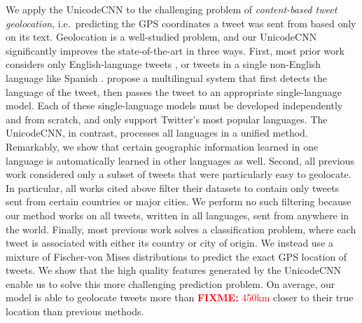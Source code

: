 \documentclass[sigconf,anonymous,review,10pt]{acmart}
\newcommand{\defn}[1]{\textit{#1}}
\newcommand{\fixme}[1]{\textcolor{red}{\textbf{FIXME:} {#1}}}
\begin{document}
We apply the UnicodeCNN to the challenging problem of \defn{content-based tweet geolocation},
i.e.\ predicting the GPS coordinates a tweet was sent from based only on its text.
Geolocation is a well-studied problem,
and our UnicodeCNN significantly improves the state-of-the-art in three ways.
First, most prior work considers only English-language tweets \citep{cheng2010you,li2012towards,han2013stacking,mahmud2014home,compton2014geotagging,zhang2014geocoding,rahimi2015twitter,dredze2016geolocation,rahimi2017neural},
or tweets in a single non-English language like Spanish \citep{maier2014language,gonccalves2015learning,tinoco2017variation}. %
\citet{han2014text} propose a multilingual system that first detects the language of the tweet,
then passes the tweet to an appropriate single-language model.
Each of these single-language models must be developed independently and from scratch,
and \citet{han2014text} only support Twitter's most popular languages.
The UnicodeCNN, in contrast, processes all languages in a unified method.
Remarkably, we show that certain geographic information learned in one language is automatically learned in other languages as well.
Second, all previous work considered only a subset of tweets that were particularly easy to geolocate.
In particular, all works cited above filter their datasets to contain only tweets sent from certain countries or major cities.
We perform no such filtering because our method works on all tweets, written in all languages, sent from anywhere in the world.
Finally, most previous work solves a classification problem,
where each tweet is associated with either its country or city of origin.
We instead use a mixture of Fischer-von Mises distributions to predict the exact GPS location of tweets.
We show that the high quality features generated by the UnicodeCNN enable us to solve this more challenging prediction problem.
On average, our model is able to geolocate tweets more than \fixme{450km} closer to their true location than previous methods.
\end{document}

